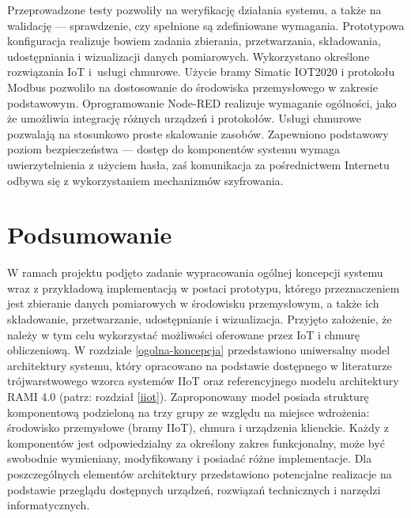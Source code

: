 \documentclass[a4paper, 12pt, twoside]{article}
\begin{document}
Przeprowadzone testy pozwoliły na weryfikację działania systemu, a także na
walidację --- sprawdzenie, czy spełnione są zdefiniowane wymagania. Prototypowa 
konfiguracja realizuje bowiem zadania zbierania, przetwarzania, składowania,
udostępniania i wizualizacji danych pomiarowych. Wykorzystano określone rozwiązania
IoT i~usługi chmurowe. Użycie bramy Simatic IOT2020 i protokołu Modbus pozwoliło na dostosowanie 
do środowiska przemysłowego w zakresie podstawowym. Oprogramowanie Node-RED
realizuje wymaganie ogólności, jako że umożliwia integrację różnych urządzeń i protokołów.
Usługi chmurowe pozwalają na stosunkowo proste skalowanie zasobów. Zapewniono
podstawowy poziom bezpieczeństwa --- dostęp do komponentów systemu wymaga uwierzytelnienia
z użyciem hasła, zaś komunikacja za pośrednictwem Internetu odbywa się z wykorzystaniem mechanizmów
szyfrowania.

\section{Podsumowanie}\label{wnioski}

W ramach projektu podjęto zadanie wypracowania ogólnej koncepcji systemu
wraz z przykładową implementacją w postaci prototypu, którego przeznaczeniem jest
zbieranie danych pomiarowych w środowisku przemysłowym, a także ich składowanie, przetwarzanie,
udostępnianie i wizualizacja. Przyjęto założenie, że należy w tym celu wykorzystać możliwości
oferowane przez IoT i chmurę obliczeniową. W rozdziale \ref{ogolna-koncepcja}
przedstawiono uniwersalny model architektury systemu, który opracowano na podstawie
dostępnego w literaturze trójwarstwowego wzorca systemów IIoT oraz referencyjnego
modelu architektury RAMI 4.0 (patrz: rozdział \ref{iiot}). Zaproponowany model
posiada strukturę komponentową podzieloną na trzy grupy ze względu na miejsce wdrożenia:
środowisko przemysłowe (bramy IIoT), chmura i urządzenia klienckie. 
Każdy z komponentów jest odpowiedzialny za określony
zakres funkcjonalny, może być swobodnie wymieniany, modyfikowany i posiadać różne implementacje.
Dla poszczególnych elementów architektury przedstawiono potencjalne realizacje
na podstawie przeglądu dostępnych urządzeń, rozwiązań technicznych i  narzędzi informatycznych. 
\end{document}
